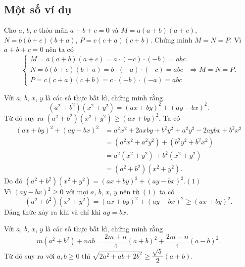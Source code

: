 \subsection{Một số ví dụ}
\begin{vd}
Cho $a$, $b$, $c$ thỏa mãn $a+b+c=0$ và $M=a(a+b)(a+c)$, $N=b(b+c)(b+a)$, $P=c(c+a)(c+b)$. Chứng minh $M=N=P$.
\loigiai
{
Vì $a+b+c=0$ nên ta có
\[\begin{cases}
M=a(a+b)(a+c)=a\cdot (-c)\cdot (-b)=abc\\
N=b(b+c)(b+a)=b\cdot (-a)\cdot (-c)=abc\\
P=c(c+a)(c+b)=c\cdot (-b)\cdot (-a)=abc
\end{cases}\Rightarrow M=N=P.\]
}
\end{vd}
\begin{vd}
Với $a$, $b$, $x$, $y$ là các số thực bất kì, chứng minh rằng
\[(a^2+b^2)(x^2+y^2)=(ax+by)^2+(ay-bx)^2.\]
Từ đó suy ra $(a^2+b^2)(x^2+y^2)\ge (ax+by)^2.$
\loigiai
{
Ta có
\begin{align*}
(ax+by)^2+(ay-bx)^2&=a^2x^2+2axby+b^2y^2+a^2y^2-2aybx+b^2x^2\\ 
&=(a^2x^2+a^2y^2)+(b^2y^2+b^2x^2)\\
&=a^2(x^2+y^2)+b^2(x^2+y^2)\\
&=(a^2+b^2)(x^2+y^2).
\end{align*}
Do đó \((a^2+b^2)(x^2+y^2)=(ax+by)^2+(ay-bx)^2.\)\hfill$(1)$\\
Vì $(ay-bx)^2\ge 0$ với mọi $a$, $b$, $x$, $y$ nên từ $(1)$ ta có
\[(a^2+b^2)(x^2+y^2)=(ax+by)^2+(ay-bx)^2\ge (ax+by)^2.\]
Đẳng thức xảy ra khi và chỉ khi $ay=bx$.
}
\end{vd}
\begin{vd}
Với $a$, $b$, $x$, $y$ là các số thực bất kì, chứng minh rằng
\[m(a^2+b^2)+nab=\dfrac{2m+n}{4}(a+b)^2+\dfrac{2m-n}{4}(a-b)^2.\]
Từ đó suy ra với $a,b\ge 0$ thì  $\sqrt{2a^2+ab+2b^2}\ge \dfrac{\sqrt{5}}{2}(a+b).$
\end{vd}

